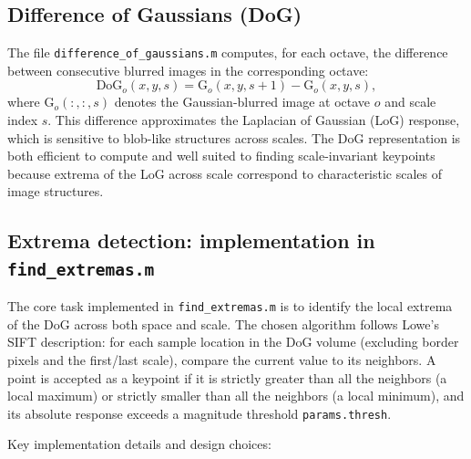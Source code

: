 \documentclass{article}
\begin{document}
\subsection*{Difference of Gaussians (DoG)}
The file \texttt{difference\_of\_gaussians.m} computes, for each octave, the difference 
between consecutive blurred images in the corresponding octave:
\[ \mathrm{DoG}_{o}(x,y,s) = \mathrm{G}_{o}(x,y,s+1) - \mathrm{G}_{o}(x,y,s), \]
where $\mathrm{G}_{o}(:,:,s)$ denotes the Gaussian-blurred image at octave $o$ and scale 
index $s$. This difference approximates the Laplacian of Gaussian (LoG) response, which 
is sensitive to blob-like structures across scales. The DoG representation is both efficient 
to compute and well suited to finding scale-invariant keypoints because extrema of the LoG 
across scale correspond to characteristic scales of image structures.

\subsection*{Extrema detection: implementation in \texttt{find\_extremas.m}}
The core task implemented in \texttt{find\_extremas.m} is to identify the local extrema of 
the DoG across both space and scale. The chosen algorithm follows Lowe's SIFT description: 
for each sample location in the DoG volume (excluding border pixels and the first/last scale), 
compare the current value to its neighbors. A point is accepted as a keypoint if it is strictly greater 
than all the neighbors (a local maximum) or strictly smaller than all the neighbors (a local 
minimum), and its absolute response exceeds a magnitude threshold \texttt{params.thresh}.

Key implementation details and design choices:
\end{document}
